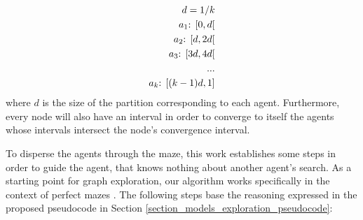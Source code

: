 \begin{equation}
\label{equation_agent_intervals}
	\begin{align}
			d = 1/k\\
		a_{1} \textnormal{: } [0, d[\\
		a_{2} \textnormal{: } [d, 2d[\\
		a_{3} \textnormal{: } [3d, 4d[\\
		...\\
		a_{k} \textnormal{: } [(k-1)d, 1]
	\end{align}
\end{equation}
where $d$ is the size of the partition corresponding to each agent. Furthermore, every node will also have an interval in order to converge to itself the agents whose intervals intersect the node's convergence interval. 


To disperse the agents through the maze, this work establishes some steps in order to guide the agent, that knows nothing about another agent's search. As a starting point for graph exploration, our algorithm works specifically in the context of perfect mazes \cite{Muhammad2021}. The following steps base the reasoning expressed in the proposed pseudocode in Section \ref{section_models_exploration_pseudocode}:


